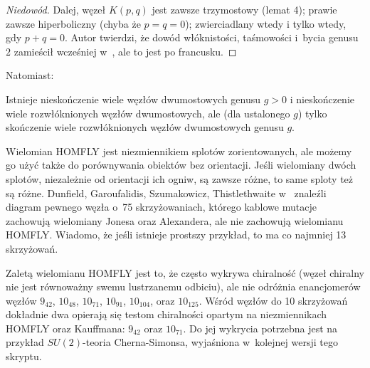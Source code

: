 \begin{proof}[Niedowód]
    Dalej, węzeł $K(p,q)$ jest zawsze trzymostowy (lemat 4); prawie zawsze hiperboliczny (chyba że $p = q = 0$); zwierciadlany wtedy i tylko wtedy, gdy $p + q = 0$.
    Autor twierdzi, że dowód włóknistości, taśmowości i~bycia genusu $2$ zamieścił wcześniej w~\cite{kanenobu1981}, ale to jest po francusku.
\end{proof}

Natomiast:

\begin{proposition}
    Istnieje nieskończenie wiele węzłów dwumostowych genusu $g > 0$ i nieskończenie wiele rozwłóknionych węzłów dwumostowych, ale (dla ustalonego $g$) tylko skończenie wiele rozwłóknionych węzłów dwumostowych genusu $g$.
\end{proposition}

Wielomian HOMFLY jest niezmiennikiem splotów zorientowanych, ale możemy go użyć także do porównywania obiektów bez orientacji.
Jeśli wielomiany dwóch splotów, niezależnie od orientacji ich ogniw, są zawsze różne, to same sploty też są różne.
Dunfield, Garoufalidis, Szumakowicz, Thistlethwaite w~\cite{dunfield2010} znaleźli diagram pewnego węzła o~75 skrzyżowaniach, którego kablowe mutacje zachowują wielomiany Jonesa oraz Alexandera, ale nie zachowują wielomianu HOMFLY.
%
%
%
%
%
Wiadomo, że jeśli istnieje prostszy przykład, to ma co najmniej 13 skrzyżowań.

Zaletą wielomianu HOMFLY jest to, że często wykrywa chiralność (węzeł chiralny nie jest równoważny swemu lustrzanemu odbiciu), ale nie odróżnia enancjomerów węzłów $9_{42}$, $10_{48}$, $10_{71}$, $10_{91}$, $10_{104}$, oraz $10_{125}$.
%
Wśród węzłów do 10 skrzyżowań dokładnie dwa opierają się testom chiralności opartym na niezmiennikach HOMFLY oraz Kauffmana: $9_{42}$ oraz $10_{71}$.
%
%
Do jej wykrycia potrzebna jest na przykład $SU(2)$-teoria Cherna-Simonsa, wyjaśniona w~kolejnej wersji tego skryptu.


%


